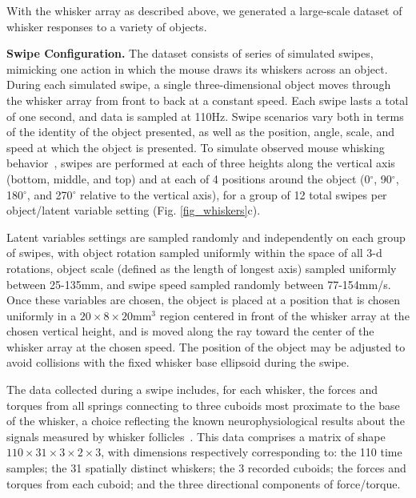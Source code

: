 With the whisker array as described above, we generated a large-scale dataset of whisker responses to a variety of objects.   

\textbf{Swipe Configuration.}  The dataset consists of series of simulated swipes, mimicking one action in which the mouse draws its whiskers across an object.  
During each simulated swipe, a single three-dimensional object moves through the whisker array from front to back at a constant speed.  
Each swipe lasts a total of one second, and data is sampled at 110Hz. 
Swipe scenarios vary both in terms of the identity of the object presented, as well as the position, angle, scale, and speed at which the object is presented.  
To simulate observed mouse whisking behavior~\cite{hobbs2015spatiotemporal}, swipes are performed at each of three heights along the vertical axis (bottom, middle, and top) and at each of 4 positions around the object (0$^{\circ}$, 90$^{\circ}$, 180$^{\circ}$, and 270$^{\circ}$ relative to the vertical axis), for a group of 12 total swipes per object/latent variable setting (Fig. \ref{fig_whiskers}c). 

Latent variables settings are sampled randomly and independently on each group of swipes, with object rotation sampled uniformly within the space of all 3-d rotations, object scale (defined as the length of longest axis) sampled uniformly between 25-135mm, and swipe speed sampled randomly between 77-154mm/s.  
Once these variables are chosen, the object is placed at a position that is chosen uniformly in a  $20 \times 8 \times 20$mm$^{3}$ region centered in front of the whisker array at the chosen vertical height, and is moved along the ray toward the center of the whisker array at the chosen speed. 
The position of the object may be adjusted to avoid collisions with the fixed whisker base ellipsoid during the swipe. 

The data collected during a swipe includes, for each whisker, the forces and torques from all springs connecting to three cuboids most proximate to the base of the whisker, a choice reflecting the known neurophysiological results about the signals measured by whisker follicles~\cite{Quist2014, Huet2016}.  
This data comprises a matrix of shape $110 \times 31 \times 3 \times 2 \times 3$, with dimensions respectively corresponding to: the 110 time samples;  the 31 spatially distinct whiskers; the 3 recorded cuboids; the forces and torques from each cuboid; and the three directional components of force/torque.   


